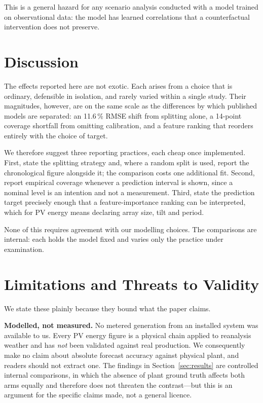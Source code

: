 \documentclass[conference]{IEEEtran}
\begin{document}
This is a general hazard for any scenario analysis conducted with a
model trained on observational data: the model has learned
correlations that a counterfactual intervention does not preserve.

\section{Discussion}

The effects reported here are not exotic. Each arises from a choice
that is ordinary, defensible in isolation, and rarely varied within a
single study. Their magnitudes, however, are on the same scale as the
differences by which published models are separated: an 11.6\,\% RMSE
shift from splitting alone, a 14-point coverage shortfall from omitting
calibration, and a feature ranking that reorders entirely with the
choice of target.

We therefore suggest three reporting practices, each cheap once
implemented. First, state the splitting strategy and, where a random
split is used, report the chronological figure alongside it; the
comparison costs one additional fit. Second, report empirical coverage
whenever a prediction interval is shown, since a nominal level is an
intention and not a measurement. Third, state the prediction target
precisely enough that a feature-importance ranking can be interpreted,
which for PV energy means declaring array size, tilt and period.

None of this requires agreement with our modelling choices. The
comparisons are internal: each holds the model fixed and varies only
the practice under examination.

\section{Limitations and Threats to Validity}
\label{sec:limits}

We state these plainly because they bound what the paper claims.

\textbf{Modelled, not measured.} No metered generation from an
installed system was available to us. Every PV energy figure is a
physical chain applied to reanalysis weather and has \emph{not} been
validated against real production. We consequently make no claim about
absolute forecast accuracy against physical plant, and readers should
not extract one. The findings in Section~\ref{sec:results} are
controlled internal comparisons, in which the absence of plant ground
truth affects both arms equally and therefore does not threaten the
contrast---but this is an argument for the specific claims made, not a
general licence.
\end{document}
